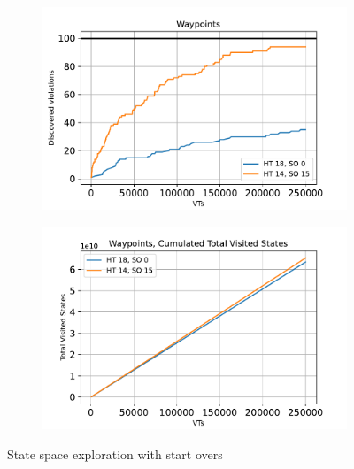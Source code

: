 \documentclass[
fancyheadings, %
%
%
]{stsreprt}
\begin{document}
\begin{figure}
    \begin{subfigure}[b]{.5\textwidth}
        \centering
        \includegraphics[width=\textwidth]{../evaluation/output-assets/EXP-04-start-overs-1.pdf}
        \label{fig:evaluation:EXP-04:1}
    \end{subfigure}
    \begin{subfigure}[b]{.5\textwidth}
        \centering
        \includegraphics[width=\textwidth]{../evaluation/output-assets/EXP-04-start-overs-3.pdf}
        \label{fig:evaluation:EXP-04:2}
    \end{subfigure}
    \caption{State space exploration with start overs}
    \label{fig:evaluation:EXP-04}
\end{figure}
\end{document}
